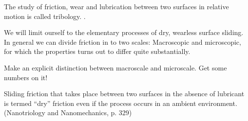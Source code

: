 




The study of friction, wear and lubrication between two surfaces in relative motion is called tribology. \cite{gnecco_meyer_2015}.

We will limit ourself to the elementary processes of dry, wearless surface sliding. In general we can divide friction in to two scales: Macroscopic and microscopic, for which the properties turns out to differ quite substantially.  

Make an explicit distinction between macroscale and microscale. Get some numbers on it!

Sliding friction that takes place between two surfaces in the absence of lubricant is termed ``dry''  friction even if the process occurs in an ambient environment. (Nanotriology and Nanomechanics, p. 329)



